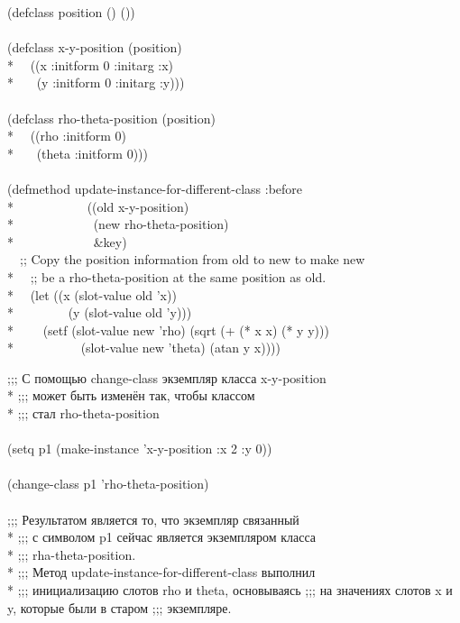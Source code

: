 \begin{defun}
\begin{lisp}
(defclass position () ()) \\
\\
(defclass x-y-position (position) \\*
~~((x :initform 0 :initarg :x) \\*
~~~(y :initform 0 :initarg :y))) \\
\\
(defclass rho-theta-position (position) \\*
~~((rho :initform 0) \\*
~~~(theta :initform 0))) \\
\\
(defmethod update-instance-for-different-class :before \\*
~~~~~~~~~~~((old x-y-position)  \\*
~~~~~~~~~~~~(new rho-theta-position) \\*
~~~~~~~~~~~~\&key) \\
~~;; Copy the position information from old to new to make new \\*
~~;; be a rho-theta-position at the same position as old. \\*
~~(let ((x (slot-value old 'x)) \\*
~~~~~~~~(y (slot-value old 'y))) \\*
~~~~(setf (slot-value new 'rho) (sqrt (+ (* x x) (* y y))) \\*
~~~~~~~~~~(slot-value new 'theta) (atan y x))))
\end{lisp}
\begin{lisp}
;;; С помощью change-class экземпляр класса x-y-position \\*
;;; может быть изменён так, чтобы классом  \\*
;;; стал rho-theta-position \\
\\
(setq p1 (make-instance 'x-y-position :x 2 :y 0)) \\
\\
(change-class p1 'rho-theta-position) \\
\\
;;; Результатом является то, что экземпляр связанный \\*
;;; с символом p1 сейчас является экземпляром класса \\*
;;; rha-theta-position. \\*
;;; Метод update-instance-for-different-class выполнил \\*
;;; инициализацию слотов rho и theta, основываясь 
;;; на значениях слотов x и y, которые были в старом 
;;; экземпляре.
\end{lisp}


\end{defun}

